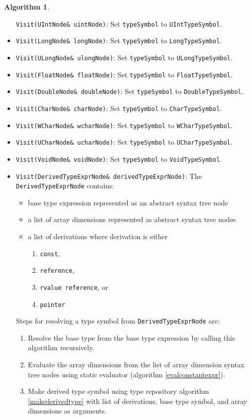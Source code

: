 \documentclass[a4paper,oneside,11pt]{book}
\theoremstyle{definition}
\newtheorem{algo}{Algorithm}[section]
\begin{document}
\begin{algo}
\begin{itemize}
\verb|Visit(UIntNode& uintNode)|:
Set \verb|typeSymbol| to \verb|UIntTypeSymbol|.
\item
\verb|Visit(LongNode& longNode)|:
Set \verb|typeSymbol| to \verb|LongTypeSymbol|.
\item
\verb|Visit(ULongNode& ulongNode)|:
Set \verb|typeSymbol| to \verb|ULongTypeSymbol|.
\item
\verb|Visit(FloatNode& floatNode)|:
Set \verb|typeSymbol| to \verb|FloatTypeSymbol|.
\item
\verb|Visit(DoubleNode& doubleNode)|:
Set \verb|typeSymbol| to \verb|DoubleTypeSymbol|.
\item
\verb|Visit(CharNode& charNode)|:
Set \verb|typeSymbol| to \verb|CharTypeSymbol|.
\item
\verb|Visit(WCharNode& wcharNode)|:
Set \verb|typeSymbol| to \verb|WCharTypeSymbol|.
\item
\verb|Visit(UCharNode& ucharNode)|:
Set \verb|typeSymbol| to \verb|UCharTypeSymbol|.
\item
\verb|Visit(VoidNode& voidNode)|:
Set \verb|typeSymbol| to \verb|VoidTypeSymbol|.
\item
\verb|Visit(DerivedTypeExprNode& derivedTypeExprNode)|:
The \verb|DerivedTypeExprNode| contains:
\begin{itemize}
\item
base type expression represented as an abstract syntax tree node
\item
a list of array dimensions represented as abstract syntax tree nodes
\item
a list of derivations where derivation is either
\begin{enumerate}
\item
\verb|const|,
\item
\verb|reference|,
\item
\verb|rvalue reference|, or
\item
\verb|pointer|
\end{enumerate}
\end{itemize}
Steps for resolving a type symbol from \verb|DerivedTypeExprNode| are:
\begin{enumerate}
\item
Resolve the base type from the base type expression by calling this algorithm recursively.
\item
Evaluate the array dimensions from the list of array dimension syntax tree nodes using static evaluator (algorithm \ref{evalconstantexpr}).
\item
Make derived type symbol using type repository algorithm \ref{makederivedtype} with list of derivations, base type symbol, and array dimensions as arguments.

\end{enumerate}
\end{itemize}
\end{algo}
\end{document}
